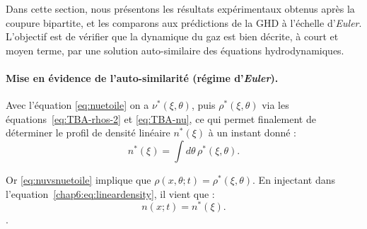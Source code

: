 Dans cette section, nous présentons les résultats expérimentaux obtenus après la coupure bipartite, et les comparons aux prédictions de la \gls{GHD} à l’échelle d’\emph{Euler}. L’objectif est de vérifier que la dynamique du gaz est bien décrite, à court et moyen terme, par une solution auto-similaire des équations hydrodynamiques.





\paragraph{Mise en évidence de l’auto-similarité (régime d’\emph{Euler}).}
Avec l'équation \eqref{eq:nuetoile} on a $\nu^*(\xi,\theta)$, puis $\rho^\ast(\xi,\theta)$ via les équations~\eqref{eq:TBA-rhos-2} et \eqref{eq:TBA-nu}, ce qui permet finalement de déterminer le profil de densité linéaire $n^\ast(\xi)$ à un instant donné : 
\begin{equation}
    n^\ast(\xi) = \int d\theta \, \rho^\ast(\xi,\theta).
    \label{chap6:eq:lineardensity}
\end{equation}


Or \eqref{eq:nuvsnuetoile} implique que 
\(
\rho(x,\theta;t) = \rho^\ast(\xi,\theta).
\)
En injectant dans l'equation~\eqref{chap6:eq:lineardensity}, il vient que  :
\begin{equation}
	n(x;t) = n^\ast\left( \xi \right).
\end{equation}
.

